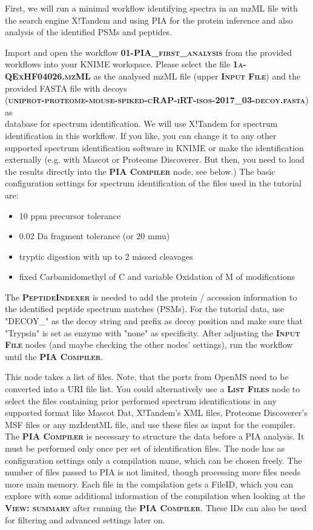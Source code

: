 \documentclass[a4paper,11pt,twoside]{article}
\newcommand{\menu}[1]{{\scshape\bfseries #1}}
\newcommand{\filepath}[1]{{\scshape\bfseries #1}}
\newcommand{\knimenode}[1]{{\scshape\bfseries #1}}
\begin{document}
First, we will run a minimal workflow identifying spectra in an mzML file with
the search engine X!Tandem and using PIA for the protein inference and also
analysis of the identified PSMs and peptides.

Import and open the workflow \filepath{01-PIA\_first\_analysis} from the
provided workflows into your KNIME workspace. Please select the file
\filepath{1a-QExHF04026.mzML} as the analysed mzML file (upper
\knimenode{Input File}) and the provided FASTA file with decoys \\
(\filepath{uniprot-proteome-mouse-spiked-cRAP-iRT-isos-2017\_03-decoy.fasta})
as \\ database for spectrum identification. We will use X!Tandem for spectrum
identification in this workflow. If you like, you can change it to any other
supported spectrum identification software in KNIME or make the identification
externally (e.g. with Mascot or Proteome Discoverer. But then, you need to load
the results directly into the \knimenode{PIA Compiler} node, see below.) The
basic configuration settings for spectrum identification of the files used in
the tutorial are:

\begin{itemize}
	\item 10 ppm precursor tolerance
	\item 0.02 Da fragment tolerance (or 20 mmu)
	\item tryptic digestion with up to 2 missed cleavages
	\item fixed Carbamidomethyl of C and variable Oxidation of M of modifications
\end{itemize}

The \knimenode{PeptideIndexer} is needed to add the protein / accession
information to the identified peptide spectrum matches (PSMs). For the tutorial
data, use "DECOY\_" as the decoy string and prefix as decoy position and make
sure that "Trypsin" is set as enzyme with "none" as specificity. After adjusting
the \knimenode{Input File} nodes (and maybe checking the other nodes' settings),
run the workflow until the \knimenode{PIA Compiler}.

This node takes a list of files. Note, that the ports from OpenMS
need to be converted into a URI file list. You could alternatively use a
\knimenode{List Files} node to select the files containing prior performed
spectrum identifications in any supported format like Mascot Dat, X!Tandem's
XML files, Proteome Discoverer's MSF files or any mzIdentML file, and use these
files as input for the compiler. The \knimenode{PIA Compiler} is necessary to
structure the data before a PIA analysis. It must be performed only once per set
of identification files. The node has as configuration settings only a
compilation name, which can be chosen freely. The number of files passed to PIA
is not limited, though processing more files needs more main memory. Each file
in the compilation gets a FileID, which you can explore with some additional
information of the compilation when looking at the \menu{View: summary} after
running the \knimenode{PIA Compiler}. These IDs can also be used for filtering
and advanced settings later on.
\end{document}

